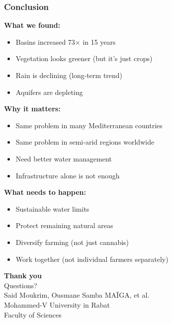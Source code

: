 \documentclass{beamer}
\begin{document}
\begin{frame}
\frametitle{Conclusion}

\textbf{What we found:}
\begin{itemize}
  \item Basins increased 73× in 15 years
  \item Vegetation looks greener (but it's just crops)
  \item Rain is declining (long-term trend)
  \item Aquifers are depleting
\end{itemize}

\vspace{0.3cm}

\textbf{Why it matters:}
\begin{itemize}
  \item Same problem in many Mediterranean countries
  \item Same problem in semi-arid regions worldwide
  \item Need better water management
  \item Infrastructure alone is not enough
\end{itemize}

\vspace{0.3cm}

\textbf{What needs to happen:}
\begin{itemize}
  \item Sustainable water limits
  \item Protect remaining natural areas
  \item Diversify farming (not just cannabis)
  \item Work together (not individual farmers separately)
\end{itemize}

\end{frame}

\begin{frame}[plain]
\begin{center}
  \vfill
  {\Huge \textbf{Thank you}}
  \\[1cm]
  {\Large Questions?}
  \\[2cm]
  \small{
    Said Moukrim, Ousmane Samba MAÏGA, et al. \\
    Mohammed-V University in Rabat \\
    Faculty of Sciences
  }
  \vfill
\end{center}
\end{frame}
\end{document}
